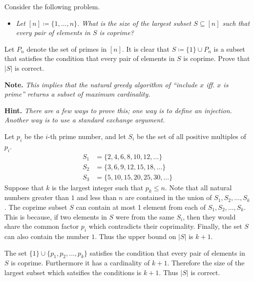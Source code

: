 \documentclass{article}
\begin{document}
\begin{question}
Consider the following problem.

\begin{itemize}
    \item[] {\em Let $[n] \coloneqq \{1, \dots, n\}$. What is the size of the largest subset $S \subseteq [n]$ such that every pair of elements in $S$ is coprime?}
\end{itemize}

Let $P_n$ denote the set of primes in $[n]$. It is clear that $S \coloneqq \{1\} \cup P_n$ is a subset that satisfies the condition that every pair of elements in $S$ is coprime. Prove that $\lvert S \rvert$ is correct.

{\bfseries Note.} {\em This implies that the natural greedy algorithm of ``include $x$ iff. $x$ is prime'' returns a subset of maximum cardinality.}

{\bfseries Hint.} {\em There are a few ways to prove this; one way is to define an injection. Another way is to use a standard exchange argument.}
\end{question}

\begin{solution}
    Let $p_i$ be the $i$-th prime number, and let $S_i$ be the set of all positive multiples of $p_i$.
    \begin{align*}
        S_1&=\{2, 4, 6, 8, 10, 12,\dots\}\\
        S_2 &= \{3, 6, 9, 12, 15, 18, \dots\}\\
        S_3 &= \{5, 10, 15, 20, 25, 30, \dots\}
    \end{align*}
    Suppose that $k$ is the largest integer such that $p_k\leq n$.
    Note that all natural numbers greater than $1$ and less than $n$ are contained in the union of $S_1, S_2, \dots, S_k$.
    The coprime subset $S$ can contain at most 1 element from each of 
    $S_1, S_2, \dots, S_k$.
    This is because, if two elements in $S$ were from 
    the same $S_i$, then they would share the common factor $p_i$ which contradicts their coprimality.
    Finally, the set $S$ can also contain the number $1$.
    Thus the upper bound on $|S|$ is $k+1$.

    The set $\{1\}\cup\{p_1, p_2,\dots, p_k\}$ satisfies the condition that every pair of elements in $S$ is coprime.
    Furthermore it has a cardinality of $k+1$. Therefore the size of the largest subset which satsifies the conditions is $k+1$.
    Thus $|S|$ is correct.

\end{solution}
\end{document}

